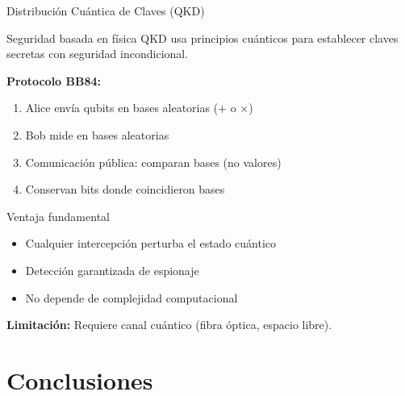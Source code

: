 \documentclass[aspectratio=169]{beamer}
\begin{document}
\begin{frame}{Distribución Cuántica de Claves (QKD)}
\begin{block}{Seguridad basada en física}
QKD usa principios cuánticos para establecer claves secretas con seguridad incondicional.
\end{block}

\textbf{Protocolo BB84:}
\begin{enumerate}
\item Alice envía qubits en bases aleatorias ($+$ o $\times$)
\item Bob mide en bases aleatorias
\item Comunicación pública: comparan bases (no valores)
\item Conservan bits donde coincidieron bases
\end{enumerate}

\vspace{0.3cm}
\begin{exampleblock}{Ventaja fundamental}
\begin{itemize}
\item Cualquier intercepción perturba el estado cuántico
\item Detección garantizada de espionaje
\item No depende de complejidad computacional
\end{itemize}
\end{exampleblock}

\textbf{Limitación:} Requiere canal cuántico (fibra óptica, espacio libre).
\end{frame}

\section{Conclusiones}
\end{document}
